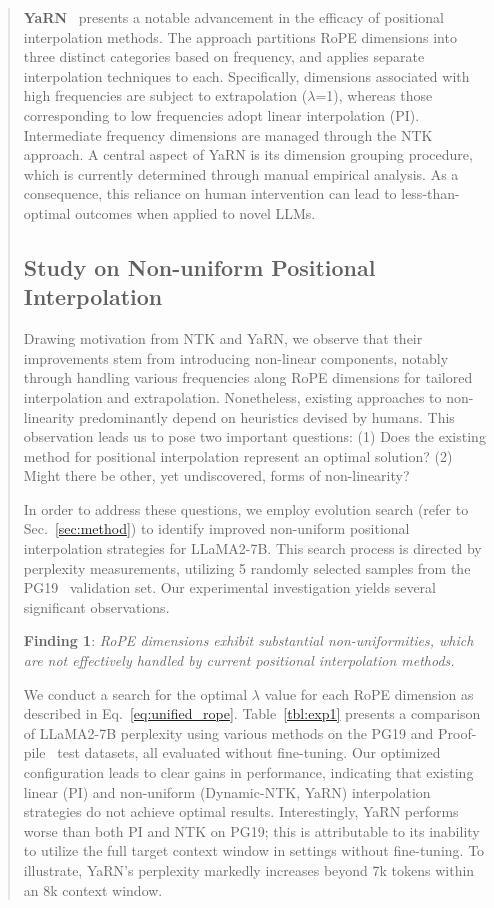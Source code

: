 \begin{abstract}
\textbf{YaRN}~\cite{yarn} presents a notable advancement in the efficacy of positional interpolation methods. The approach partitions RoPE dimensions into three distinct categories based on frequency, and applies separate interpolation techniques to each. Specifically, dimensions associated with high frequencies are subject to extrapolation ($\lambda$=1), whereas those corresponding to low frequencies adopt linear interpolation (PI). Intermediate frequency dimensions are managed through the NTK approach. A central aspect of YaRN is its dimension grouping procedure, which is currently determined through manual empirical analysis. As a consequence, this reliance on human intervention can lead to less-than-optimal outcomes when applied to novel LLMs.

\subsection{Study on Non-uniform Positional Interpolation}

Drawing motivation from NTK and YaRN, we observe that their improvements stem from introducing non-linear components, notably through handling various frequencies along RoPE dimensions for tailored interpolation and extrapolation. Nonetheless, existing approaches to non-linearity predominantly depend on heuristics devised by humans. This observation leads us to pose two important questions: (1) Does the existing method for positional interpolation represent an optimal solution? (2) Might there be other, yet undiscovered, forms of non-linearity?

In order to address these questions, we employ evolution search (refer to Sec.~\ref{sec:method}) to identify improved non-uniform positional interpolation strategies for LLaMA2-7B. This search process is directed by perplexity measurements, utilizing 5 randomly selected samples from the PG19~\cite{pg19} validation set. Our experimental investigation yields several significant observations.

\textbf{Finding 1}: \textit{RoPE dimensions exhibit substantial non-uniformities, which are not effectively handled by current positional interpolation methods.}

We conduct a search for the optimal $\lambda$ value for each RoPE dimension as described in Eq.~\ref{eq:unified_rope}. Table~\ref{tbl:exp1} presents a comparison of LLaMA2-7B perplexity using various methods on the PG19 and Proof-pile~\cite{proof-pile} test datasets, all evaluated without fine-tuning. Our optimized configuration leads to clear gains in performance, indicating that existing linear (PI) and non-uniform (Dynamic-NTK, YaRN) interpolation strategies do not achieve optimal results. Interestingly, YaRN performs worse than both PI and NTK on PG19; this is attributable to its inability to utilize the full target context window in settings without fine-tuning. To illustrate, YaRN’s perplexity markedly increases beyond 7k tokens within an 8k context window.


\end{abstract}
